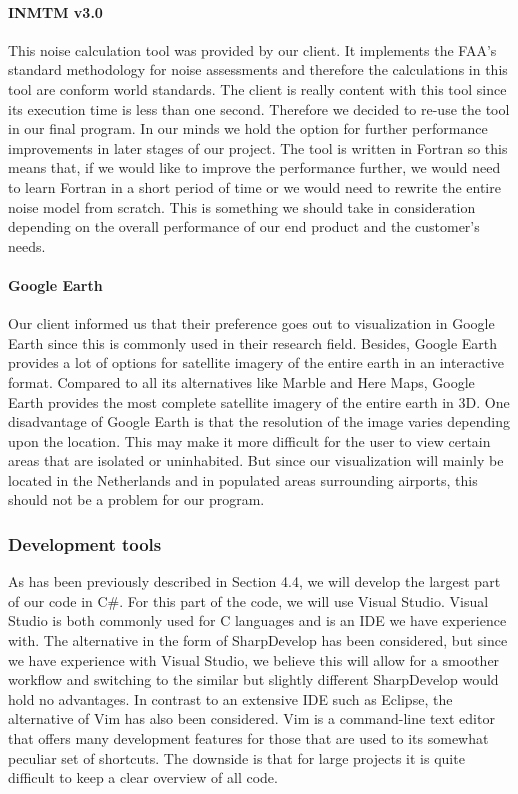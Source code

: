 \paragraph{INMTM v3.0} This noise calculation tool was provided by our client. It implements the FAA’s standard methodology for noise assessments and therefore the calculations in this tool are conform world standards. The client is really content with this tool since its execution time is less than one second. Therefore we decided to re-use the tool in our final program. In our minds we hold the option for further performance improvements in later stages of our project. The tool is written in Fortran so this means that, if we would like to improve the performance further, we would need to learn Fortran in a short period of time or we would need to rewrite the entire noise model from scratch. This is something we should take in consideration depending on the overall performance of our end product and the customer's needs.

\paragraph{Google Earth} Our client informed us that their preference goes out to visualization in Google Earth since this is commonly used in their research field. Besides, Google Earth provides a lot of options for satellite imagery of the entire earth in an interactive format. Compared to all its alternatives like Marble and Here Maps, Google Earth provides the most complete satellite imagery of the entire earth in 3D. One disadvantage of Google Earth is that the resolution of the image varies depending upon the location. This may make it more difficult for the user to view certain areas that are isolated or uninhabited. But since our visualization will mainly be located in the Netherlands and in populated areas surrounding airports, this should not be a problem for our program.

\subsubsection{Development tools}
As has been previously described in Section 4.4, we will develop the largest part of our code in C\#. For this part of the code, we will use Visual Studio. Visual Studio is both commonly used for C languages and is an IDE we have experience with. The alternative in the form of SharpDevelop has been considered, but since we have experience with Visual Studio, we believe this will allow for a smoother workﬂow and switching to the similar but slightly different SharpDevelop would hold no advantages. In contrast to an extensive IDE such as Eclipse, the alternative of Vim has also been considered. Vim is a command-line text editor that oﬀers many development features for those that are used to its somewhat peculiar set of shortcuts. The downside is that for large projects it is quite diﬃcult to keep a clear overview of all code. 

